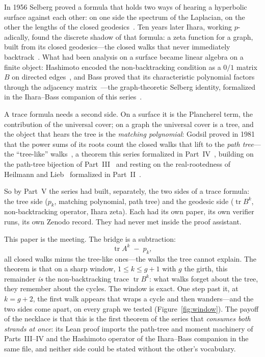 \documentclass[11pt]{article}
\DeclareMathOperator{\tr}{tr}
\begin{document}
In 1956 Selberg proved a formula that holds two ways of hearing a hyperbolic surface against
each other: on one side the spectrum of the Laplacian, on the other the lengths of the closed
geodesics~\cite{Selberg1956}. Ten years later Ihara, working $p$-adically, found the discrete
shadow of that formula: a zeta function for a graph, built from its closed geodesics---the
closed walks that never immediately backtrack~\cite{Ihara1966}. What had been analysis on a
surface became linear algebra on a finite object: Hashimoto encoded the non-backtracking
condition as a $0/1$ matrix $B$ on directed edges~\cite{Hashimoto1989}, and Bass proved that
its characteristic polynomial factors through the adjacency matrix~\cite{Bass1992}---the
graph-theoretic Selberg identity, formalized in the Ihara--Bass companion of this
series~\cite{MarinBass2026}.

A trace formula needs a second side. On a surface it is the Plancherel term, the contribution
of the universal cover; on a graph the universal cover is a tree, and the object that hears
the tree is the \emph{matching polynomial}: Godsil proved in 1981 that the power sums of its
roots count the closed walks that lift to the \emph{path tree}---the ``tree-like''
walks~\cite{Godsil1981}, a theorem this series formalized in Part~IV~\cite{MarinMoment2026},
building on the path-tree bijection of Part~III~\cite{MarinPTW2026} and resting on the
real-rootedness of Heilmann and Lieb~\cite{HeilmannLieb1972} formalized in
Part~II~\cite{MarinHL2026}.

So by Part~V the series had built, separately, the two sides of a trace formula: the
tree side ($p_k$, matching polynomial, path tree) and the geodesic side ($\tr B^k$,
non-backtracking operator, Ihara zeta). Each had its own paper, its own verifier runs, its own
Zenodo record. They had never met inside the proof assistant.

This paper is the meeting. The bridge is a subtraction:
\[
\tr A^k \;-\; p_k,
\]
all closed walks minus the tree-like ones---the walks the tree cannot explain. The theorem is
that on a sharp window, $1 \le k \le g+1$ with $g$ the girth, this remainder \emph{is} the
non-backtracking trace $\tr B^k$: what walks forget about the tree, they remember about the
cycles. The window is exact. One step past it, at $k = g+2$, the first walk appears that
wraps a cycle and then wanders---and the two sides come apart, on every graph we tested
(Figure~\ref{fig:window}). The payoff of the necklace is that this is the first theorem of
the series that \emph{consumes both strands at once}: its Lean proof imports the path-tree
and moment machinery of Parts~III--IV and the Hashimoto operator of the Ihara--Bass companion
in the same file, and neither side could be stated without the other's vocabulary.
\end{document}
